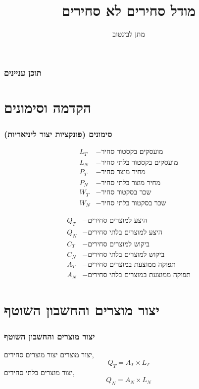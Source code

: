 \documentclass[usenames,dvipsnames]{beamer}
\title[]{מודל סחירים לא סחירים}
\author{מתן לבינטוב}
\institute[{{ אב"ג}}]{{ אוניברסיטת בן גוריון בנגב}}
\date{}
\begin{document}
\begin{RTL}
\begin{frame}
\titlepage
\end{frame}
\begin{frame}
    \frametitle{תוכן עניינים}
    \tableofcontents
\end{frame}
\section{הקדמה וסימונים}
\begin{frame}
    \frametitle{סימונים (פונקציות יצור ליניאריות)}
    \begin{minipage}[t]{0.6\textwidth}
        \begin{align*}
        L_T &- \text{מועסקים בקסטור סחיר} \\
        L_N &- \text{מועסקים בקסטור בלתי סחיר} \\
        P_T &- \text{מחיר מוצר סחיר} \\
        P_N &- \text{מחיר מוצר בלתי סחיר} \\
        W_T &- \text{שכר בסקטור סחיר} \\
        W_N &- \text{שכר בסקטור בלתי סחיר}
        \end{align*}
    \end{minipage}%
    \begin{minipage}[t]{0.5\textwidth}
        \begin{align*}
        Q_T & -  \text{היצע למוצרים סחירים} \\
        Q_N & -  \text{היצע למוצרים בלתי סחירים} \\
        C_T & -  \text{ביקוש למוצרים סחירים} \\
        C_N & -  \text{ביקוש למוצרים בלתי סחירים} \\
        A_T & -  \text{תפוקה ממוצעת במוצרים סחירים} \\
        A_N & -  \text{תפוקה ממוצעת במוצרים בלתי סחירים}
        \end{align*}
    \end{minipage}

    

\end{frame}
\section{יצור מוצרים והחשבון השוטף}
\begin{frame}[allowframebreaks]
    \frametitle{יצור מוצרים והחשבון השוטף}
    \begin{block}{יצור מוצרים}
        יצור מוצרים סחירים,
        $$Q_T = A_T \times L_T$$
        יצור מוצרים בלתי סחירים,
        $$Q_N = A_N \times L_N$$
    \end{block}


\end{frame}
\end{RTL}
\end{document}
